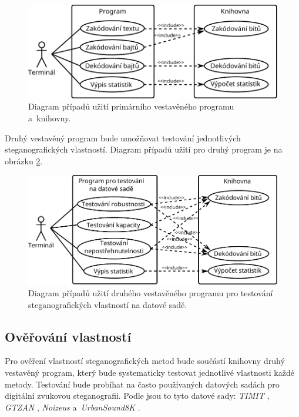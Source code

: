 \begin{figure}[hbt]
    \centering
    \includegraphics[width=\textwidth]{obrazky/use-case-diagram-1.pdf}
    \caption{Diagram případů užití primárního vestavěného programu a~knihovny.}
    \label{pic:use-case-diagram-main}
\end{figure}

Druhý vestavěný program bude umožňovat testování jednotlivých steganografických
vlastností. Diagram případů užití pro druhý program je na obrázku
\ref{pic:use-case-diagram-testing}.

\begin{figure}[hbt]
    \centering
    \includegraphics[width=\textwidth]{obrazky/use-case-diagram-2.pdf}
    \caption{Diagram případů užití druhého vestavěného programu pro testování
    steganografických vlastností na datové sadě.}
    \label{pic:use-case-diagram-testing}
\end{figure}

\subsection*{Ověřování vlastností}
\label{sub:method-property-verification}

Pro ověření vlastností steganografických metod bude součástí knihovny druhý
vestavěný program, který bude systematicky testovat jednotlivé vlastnosti každé
metody. Testování bude probíhat na často používaných datových sadách pro
digitální zvukovou steganografii. Podle \cite{AlSabhany2020} jsou to tyto
datové sady: \textit{TIMIT} \cite{Garofolo1993}, \textit{GTZAN}
\cite{Tzanetakis2001}, \textit{Noizeus} \cite{Hu2006} a~\textit{UrbanSound8K}
\cite{Salamon2014}.

